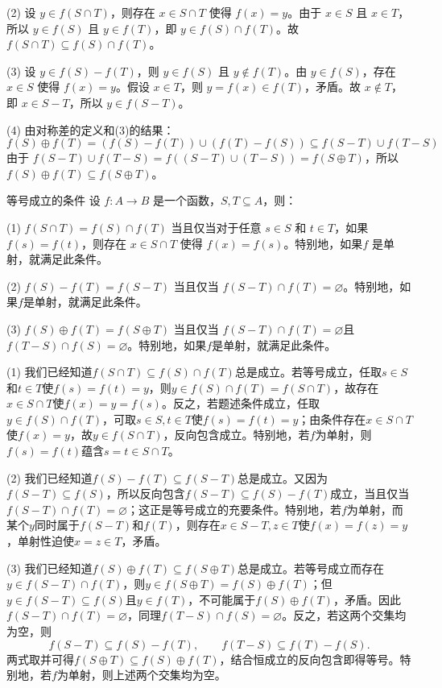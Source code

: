 \documentclass[lang=cn,11pt]{elegantbook}
\begin{document}
(2) 设 $y \in f(S \cap T)$，则存在 $x \in S \cap T$ 使得 $f(x) = y$。由于 $x \in S$ 且 $x \in T$，所以 $y \in f(S)$ 且 $y \in f(T)$，即 $y \in f(S) \cap f(T)$。故 $f(S \cap T) \subseteq f(S) \cap f(T)$。

(3) 设 $y \in f(S) - f(T)$，则 $y \in f(S)$ 且 $y \notin f(T)$。由 $y \in f(S)$，存在 $x \in S$ 使得 $f(x) = y$。假设 $x \in T$，则 $y = f(x) \in f(T)$，矛盾。故 $x \notin T$，即 $x \in S - T$，所以 $y \in f(S - T)$。

(4) 由对称差的定义和(3)的结果：
\[
f(S) \oplus f(T) = (f(S) - f(T)) \cup (f(T) - f(S)) \subseteq f(S - T) \cup f(T - S)
\]
由于 $f(S - T) \cup f(T - S) = f((S - T) \cup (T - S)) = f(S \oplus T)$，所以 $f(S) \oplus f(T) \subseteq f(S \oplus T)$。
\begin{theorem}{等号成立的条件}
设 $f: A \to B$ 是一个函数，$S, T \subseteq A$，则：

(1) $f(S \cap T) = f(S) \cap f(T)$ 当且仅当对于任意 $s \in S$ 和 $t \in T$，如果 $f(s) = f(t)$，则存在 $x \in S \cap T$ 使得 $f(x) = f(s)$。特别地，如果$f$ 是单射，就满足此条件。

(2) $f(S) - f(T) = f(S - T)$ 当且仅当 $f(S-T)\cap f(T)=\varnothing$。特别地，如果$f$是单射，就满足此条件。

(3) $f(S) \oplus f(T) = f(S \oplus T)$ 当且仅当 $f(S-T)\cap f(T)=\varnothing$且$f(T-S)\cap f(S)=\varnothing$。特别地，如果$f$是单射，就满足此条件。
\end{theorem}
(1) 我们已经知道$f(S\cap T)\subseteq f(S)\cap f(T)$总是成立。若等号成立，任取$s\in S$和$t\in T$使$f(s)=f(t)=y$，则$y\in f(S)\cap f(T)=f(S\cap T)$，故存在$x\in S\cap T$使$f(x)=y=f(s)$。反之，若题述条件成立，任取$y\in f(S)\cap f(T)$，可取$s\in S,t\in T$使$f(s)=f(t)=y$；由条件存在$x\in S\cap T$使$f(x)=y$，故$y\in f(S\cap T)$，反向包含成立。特别地，若$f$为单射，则$f(s)=f(t)$蕴含$s=t\in S\cap T$。

(2) 我们已经知道$f(S)-f(T)\subseteq f(S-T)$总是成立。又因为$f(S-T)\subseteq f(S)$，所以反向包含$f(S-T)\subseteq f(S)-f(T)$成立，当且仅当$f(S-T)\cap f(T)=\varnothing$；这正是等号成立的充要条件。特别地，若$f$为单射，而某个$y$同时属于$f(S-T)$和$f(T)$，则存在$x\in S-T,z\in T$使$f(x)=f(z)=y$，单射性迫使$x=z\in T$，矛盾。

(3) 我们已经知道$f(S)\oplus f(T)\subseteq f(S\oplus T)$总是成立。若等号成立而存在$y\in f(S-T)\cap f(T)$，则$y\in f(S\oplus T)=f(S)\oplus f(T)$；但$y\in f(S-T)\subseteq f(S)$且$y\in f(T)$，不可能属于$f(S)\oplus f(T)$，矛盾。因此$f(S-T)\cap f(T)=\varnothing$，同理$f(T-S)\cap f(S)=\varnothing$。反之，若这两个交集均为空，则
\[
f(S-T)\subseteq f(S)-f(T),\qquad f(T-S)\subseteq f(T)-f(S).
\]
两式取并可得$f(S\oplus T)\subseteq f(S)\oplus f(T)$，结合恒成立的反向包含即得等号。特别地，若$f$为单射，则上述两个交集均为空。
\end{document}
